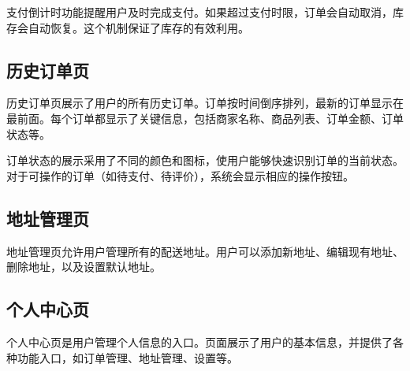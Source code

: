 \documentclass[a4paper,12pt]{article}
\begin{document}
支付倒计时功能提醒用户及时完成支付。如果超过支付时限，订单会自动取消，库存会自动恢复。这个机制保证了库存的有效利用。

\subsection{历史订单页}

历史订单页展示了用户的所有历史订单。订单按时间倒序排列，最新的订单显示在最前面。每个订单都显示了关键信息，包括商家名称、商品列表、订单金额、订单状态等。

\begin{center}
\end{center}

订单状态的展示采用了不同的颜色和图标，使用户能够快速识别订单的当前状态。对于可操作的订单（如待支付、待评价），系统会显示相应的操作按钮。

\subsection{地址管理页}

地址管理页允许用户管理所有的配送地址。用户可以添加新地址、编辑现有地址、删除地址，以及设置默认地址。

\begin{center}
\end{center}

\subsection{个人中心页}

个人中心页是用户管理个人信息的入口。页面展示了用户的基本信息，并提供了各种功能入口，如订单管理、地址管理、设置等。
\end{document}
